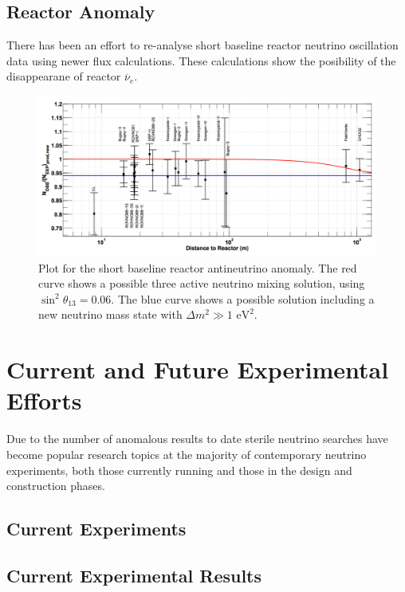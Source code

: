 \documentclass[aps,prd,twocolumn,nofootinbib]{revtex4-1}
\begin{document}
\subsection{Reactor Anomaly}
There has been an effort to re-analyse short baseline reactor neutrino oscillation data using newer flux calculations. These calculations show the posibility of the disappearane of reactor $\overline{\nu}_e$.
\begin{figure}[H]
  \centering
  \includegraphics[width=1\columnwidth]{../figures/reactor_anom.png}
  \caption{Plot for the short baseline reactor antineutrino anomaly. The red curve shows a possible three active neutrino mixing solution, using $\sin^2\theta_{13} = 0.06$. The blue curve shows a possible solution including a new neutrino mass state with $\Delta m^2 \gg 1\text{ eV}^2$.}
\end{figure}

\section{Current and Future Experimental Efforts}
Due to the number of anomalous results to date sterile neutrino searches have become popular research topics at the majority of contemporary neutrino experiments, both those currently running and those in the design and construction phases.

\subsection{Current Experiments}

\subsection{Current Experimental Results}
\end{document}

